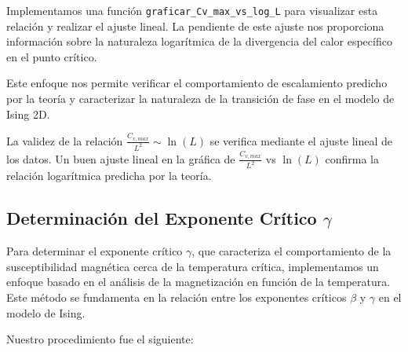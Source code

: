 \documentclass[twocolumn]{article}
\begin{document}
Implementamos una función \texttt{graficar\_Cv\_max\_vs\_log\_L} para visualizar esta relación y realizar el ajuste lineal. La pendiente de este ajuste nos proporciona información sobre la naturaleza logarítmica de la divergencia del calor específico en el punto crítico.

Este enfoque nos permite verificar el comportamiento de escalamiento predicho por la teoría y caracterizar la naturaleza de la transición de fase en el modelo de Ising 2D.

La validez de la relación $\frac{C_{v,max}}{L^2} \sim \ln(L)$ se verifica mediante el ajuste lineal de los datos. Un buen ajuste lineal en la gráfica de $\frac{C_{v,max}}{L^2}$ vs $\ln(L)$ confirma la relación logarítmica predicha por la teoría. 

\subsection*{Determinación del Exponente Crítico $\gamma$}

Para determinar el exponente crítico $\gamma$, que caracteriza el comportamiento de la susceptibilidad magnética cerca de la temperatura crítica, implementamos un enfoque basado en el análisis de la magnetización en función de la temperatura. Este método se fundamenta en la relación entre los exponentes críticos $\beta$ y $\gamma$ en el modelo de Ising.

Nuestro procedimiento fue el siguiente:
\end{document}

